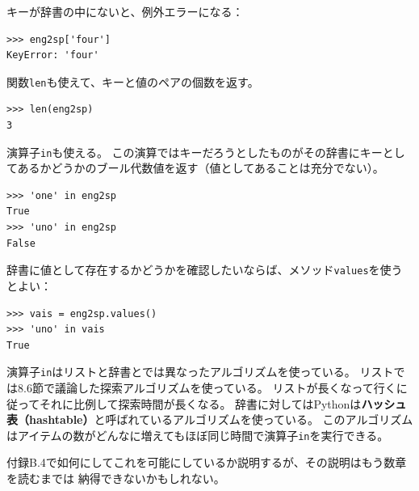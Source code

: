 \documentclass[a4j,12pt,makeidx]{jbook}
\begin{document}
キーが辞書の中にないと、例外エラーになる：
\begin{verbatim}
>>> eng2sp['four']
KeyError: 'four'
\end{verbatim} \par
関数{\tt len}も使えて、キーと値のペアの個数を返す。
\begin{verbatim}
>>> len(eng2sp)
3
\end{verbatim} \par
演算子{\tt in}も使える。
この演算ではキーだろうとしたものがその辞書にキーとしてあるかどうかのブール代数値を返す（値としてあることは充分でない）。
\begin{verbatim}
>>> 'one' in eng2sp
True
>>> 'uno' in eng2sp
False
\end{verbatim} \par
辞書に値として存在するかどうかを確認したいならば、メソッド{\tt values}を使うとよい：
\begin{verbatim}
>>> vais = eng2sp.values()
>>> 'uno' in vais
True
\end{verbatim} \par
演算子{\tt in}はリストと辞書とでは異なったアルゴリズムを使っている。
リストでは8.6節で議論した探索アルゴリズムを使っている。
リストが長くなって行くに従ってそれに比例して探索時間が長くなる。
辞書に対してはPythonは{\bf ハッシュ表（hashtable）}と呼ばれているアルゴリズムを使っている。
このアルゴリズムはアイテムの数がどんなに増えてもほぼ同じ時間で演算子{\tt in}を実行できる。\par
付録B.4で如何にしてこれを可能にしているか説明するが、その説明はもう数章を読むまでは
納得できないかもしれない。
%
\end{document}

